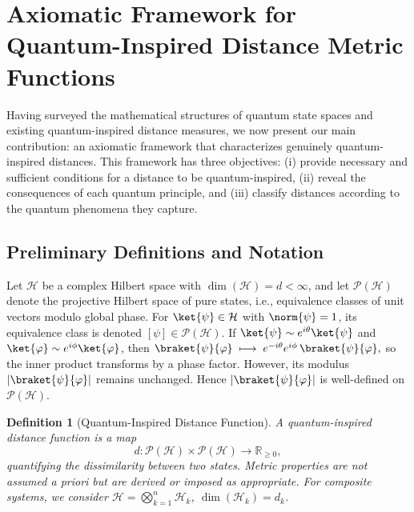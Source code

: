\documentclass[aps,pra,reprint,nofootinbib,showpacs,superscriptaddress]{revtex4-1}
\newtheorem{definition}[theorem]{Definition}
\newcommand{\Hilbert}{\mathcal{H}}
\newcommand{\Proj}{\mathcal{P}}
\begin{document}
\section{Axiomatic Framework for Quantum-Inspired Distance Metric  Functions}\label{sec:axiom}

Having surveyed the mathematical structures of quantum state spaces and existing quantum-inspired distance measures, we now present our main contribution: an axiomatic framework that characterizes genuinely quantum-inspired distances. This framework has three objectives: (i) provide necessary and sufficient conditions for a distance to be quantum-inspired, (ii) reveal the consequences of each quantum principle, and (iii) classify distances according to the quantum phenomena they capture.

\subsection{Preliminary Definitions and Notation}

Let $\Hilbert$ be a complex Hilbert space with $\dim(\Hilbert) = d < \infty$, and let $\Proj(\Hilbert)$ denote the projective Hilbert space of pure states, i.e., equivalence classes of unit vectors modulo global phase. For $\ket{\psi} \in \Hilbert$ with $\norm{\psi} = 1$, its equivalence class is denoted $[\psi] \in \Proj(\Hilbert)$. If $\ket{\psi} \sim e^{i\theta}\ket{\psi}$ and 
$\ket{\varphi} \sim e^{i\phi}\ket{\varphi}$, then
\(
\braket{\psi}{\varphi}
\;\longmapsto\;
e^{-i\theta} e^{i\phi}\,\braket{\psi}{\varphi},
\)
so the inner product transforms by a phase factor. However, its modulus
\(
\left|\braket{\psi}{\varphi}\right|
\)
remains unchanged. Hence $\left|\braket{\psi}{\varphi}\right|$ is well-defined on $\Proj(\Hilbert)$.



\begin{definition}[Quantum-Inspired Distance Function]
A \emph{quantum-inspired distance function} is a map
\[
d: \Proj(\Hilbert) \times \Proj(\Hilbert) \to \mathbb{R}_{\geq 0},
\]
quantifying the dissimilarity between two states. Metric properties are not assumed a priori but are derived or imposed as appropriate. For composite systems, we consider $\Hilbert = \bigotimes_{k=1}^n \Hilbert_k$, $\dim(\Hilbert_k) = d_k$.
\end{definition}
\end{document}
